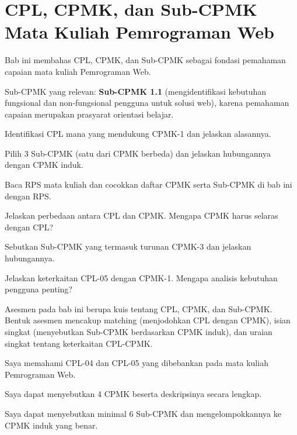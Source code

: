 \documentclass[../main.tex]{subfiles}
\begin{document}
\chapter{CPL, CPMK, dan Sub-CPMK Mata Kuliah Pemrograman Web}

\begin{subcpmk}
  \item Bab ini membahas CPL, CPMK, dan Sub-CPMK sebagai fondasi pemahaman capaian mata kuliah Pemrograman Web.
  \item Sub-CPMK yang relevan: \textbf{Sub-CPMK 1.1} (mengidentifikasi kebutuhan fungsional dan non-fungsional pengguna untuk solusi web), karena pemahaman capaian merupakan prasyarat orientasi belajar.
\end{subcpmk}





\begin{aktivitas}
  \item Identifikasi CPL mana yang mendukung CPMK-1 dan jelaskan alasannya.
  \item Pilih 3 Sub-CPMK (satu dari CPMK berbeda) dan jelaskan hubungannya dengan CPMK induk.
  \item Baca RPS mata kuliah dan cocokkan daftar CPMK serta Sub-CPMK di bab ini dengan RPS.
\end{aktivitas}

\begin{latihan}
  \item Jelaskan perbedaan antara CPL dan CPMK. Mengapa CPMK harus selaras dengan CPL?
  \item Sebutkan Sub-CPMK yang termasuk turunan CPMK-3 dan jelaskan hubungannya.
  \item Jelaskan keterkaitan CPL-05 dengan CPMK-1. Mengapa analisis kebutuhan pengguna penting?
\end{latihan}

\begin{asesmen}
Asesmen pada bab ini berupa kuis tentang CPL, CPMK, dan Sub-CPMK. Bentuk asesmen mencakup matching (menjodohkan CPL dengan CPMK), isian singkat (menyebutkan Sub-CPMK berdasarkan CPMK induk), dan uraian singkat tentang keterkaitan CPL-CPMK.
\end{asesmen}

\begin{checklist}
  \item Saya memahami CPL-04 dan CPL-05 yang dibebankan pada mata kuliah Pemrograman Web.
  \item Saya dapat menyebutkan 4 CPMK beserta deskripsinya secara lengkap.
  \item Saya dapat menyebutkan minimal 6 Sub-CPMK dan mengelompokkannya ke CPMK induk yang benar.
\end{checklist}
\end{document}

